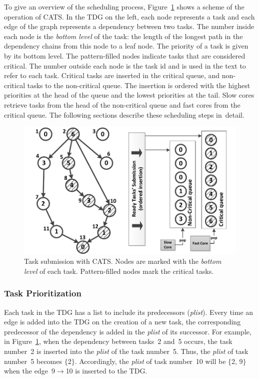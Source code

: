 To give an overview of the scheduling process, Figure~\ref{botlevels} shows a scheme of the operation of CATS. In the TDG on the left, each node represents a task and each edge of the graph represents a dependency between two tasks. The number inside each node is the \textit{bottom level} of the task: the length of the longest path in the dependency chains from this node to a leaf node. The priority of a task is given by its bottom level. The pattern-filled nodes indicate tasks that are considered critical. The number outside each node is the task id and is used in the text to refer to each task. Critical tasks are inserted in the critical queue, and non-critical tasks to the non-critical queue. The insertion is ordered with the highest priorities at the head of the queue and the lowest priorities at the tail. Slow cores retrieve tasks from the head of the non-critical queue and fast cores from the critical queue. The following sections describe these scheduling steps in~detail.


\begin{figure}[t]
\includegraphics[width=\columnwidth]{images/fig_1.pdf} 
\centering
\caption{Task submission with CATS. Nodes are marked with the \textit{bottom level} of each task. Pattern-filled nodes mark the critical tasks.}
\label{botlevels}
\vspace{-0.5cm}
\end{figure}


\subsubsection{Task Prioritization}

Each task in the TDG has a list to include its predecessors (\textit{plist}). Every time an edge is added into the TDG on the creation of a new task, the corresponding predecessor of the dependency is added in the \textit{plist} of its successor. For example, in Figure~\ref{botlevels}, when the dependency between tasks~2 and~5 occurs, the task number~2 is inserted into the \textit{plist} of the task number~5. Thus, the \textit{plist} of task number~5 becomes $\{$2$\}$. Accordingly, the \textit{plist} of task number~10 will be $\{$2, 9$\}$ when the edge~9$\rightarrow$10 is inserted to the TDG. 

